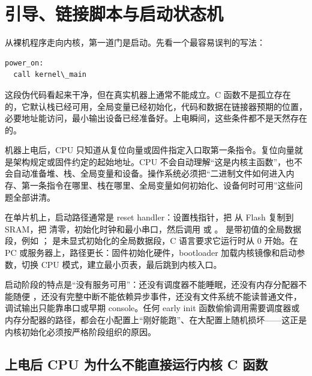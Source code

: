 
\section{引导、链接脚本与启动状态机}

从裸机程序走向内核，第一道门是启动。先看一个最容易误判的写法：

\begin{lstlisting}
power_on:
  call kernel\_main
\end{lstlisting}

这段伪代码看起来干净，但在真实机器上通常不能成立。C 函数不是孤立存在的，它默认栈已经可用，全局变量已经初始化，代码和数据在链接器预期的位置，必要地址能访问，最小输出设备已经准备好。上电瞬间，这些条件都不是天然存在的。

机器上电后，CPU 只知道从复位向量或固件指定入口取第一条指令。复位向量就是架构规定或固件约定的起始地址。CPU 不会自动理解“这是内核主函数”，也不会自动准备堆、栈、全局变量和设备。操作系统必须把“二进制文件如何进入内存、第一条指令在哪里、栈在哪里、全局变量如何初始化、设备何时可用”这些问题全部讲清。

在单片机上，启动路径通常是 reset handler：设置栈指针，把  从 Flash 复制到 SRAM，把  清零，初始化时钟和最小串口，然后调用  或 。 是带初值的全局数据段，例如 ； 是未显式初始化的全局数据段，C 语言要求它运行时从 0 开始。在 PC 或服务器上，路径更长：固件初始化硬件，bootloader 加载内核镜像和启动参数，切换 CPU 模式，建立最小页表，最后跳到内核入口。

\begin{warningbox}
启动阶段的特点是“没有服务可用”：还没有调度器不能睡眠，还没有内存分配器不能随便 ，还没有完整中断不能依赖异步事件，还没有文件系统不能读普通文件，调试输出只能靠串口或早期 console。任何 early init 函数偷偷调用需要调度器或内存分配器的路径，都会在小配置上“刚好能跑”、在大配置上随机损坏——这正是内核初始化必须按严格阶段组织的原因。
\end{warningbox}

\subsection{上电后 CPU 为什么不能直接运行内核 C 函数}

